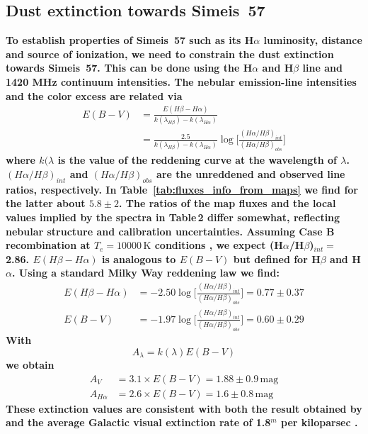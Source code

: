 \documentclass{aa}
\begin{document}
\subsection{Dust extinction towards Simeis~57}
\par \textbf{To establish properties of Simeis~57 such as its
  H$\alpha$ luminosity, distance and source of ionization, we need to
  constrain the dust extinction towards Simeis~57. This can be done
  using the H$\alpha$ and H$\beta$ line and 1420 MHz continuum
  intensities. The nebular emission-line intensities and the color
  excess are related via \citep[see for details][]{Momcheva_2013}}
\begin{equation}
\begin{split}
    E(B-V) &= \frac{E(H\beta-H\alpha)}{k(\lambda_{H\beta})-k(\lambda_{H\alpha})}\\
    &= \frac{2.5}{k(\lambda_{H\beta})-k(\lambda_{H\alpha})} \log \Big[\frac{(H\alpha/H\beta)_{int}}{(H\alpha/H\beta)_{obs}} \Big]
\end{split}
\end{equation}
\noindent
\textbf{where $k(\lambda$ is the value of the reddening curve at the
  wavelength of $\lambda$.  $(H\alpha/H\beta)_{int}$ and
  $(H\alpha/H\beta)_{obs}$ are the unreddened and observed line
  ratios, respectively. In Table\, \ref{tab:fluxes_info_from_maps} we
  find for the latter about $5.8\pm2$.  The ratios of the map fluxes
  and the local values implied by the spectra in Table\,2 differ
  somewhat, reflecting nebular structure and calibration
  uncertainties. Assuming Case B recombination at
  $T_e=10000\,\mathrm{K}$ conditions \citep{2011piim.book.....D}, we
  expect (H$\alpha$/H$\beta$)$_{int}=$ 2.86. $E(H\beta-H\alpha)$ is
  analogous to $E(B-V)$ but defined for H$\beta$ and H$\alpha$. Using
  a standard Milky Way reddening law \citep{Cardelli1989} we find:}
\begin{equation}
\begin{split}
    E(H\beta - H\alpha) &= -2.50 \log \Big[\frac{(H\alpha/H\beta)_{int}}{(H\alpha/H\beta)_{obs}} \Big] = 0.77\pm0.37\\
    E(B-V) &= -1.97 \log \Big[\frac{(H\alpha/H\beta)_{int}}{(H\alpha/H\beta)_{obs}} \Big] = 0.60\pm 0.29
\end{split}
\end{equation}
\textbf{With}
\begin{equation}
    A_{\lambda} = k(\lambda) E(B-V)
    \label{eqk_lambda}
\end{equation}
\textbf{we obtain}
\begin{equation}
\begin{split}
    A_V \,&= 3.1\times E(B-V)=1.88\pm0.9\,\mathrm{mag}\\
    A_{H\alpha} &= 2.6\times E(B-V) = 1.6\pm0.8\,\mathrm{mag}    
\end{split}
\end{equation} 
\textbf{These extinction values are consistent with both the result
  obtained by \cite{israel2003} and the average Galactic visual
  extinction rate of 1.8$^{m}$ per kiloparsec 
  \citep{whittet2002dust}.}
\end{document}
